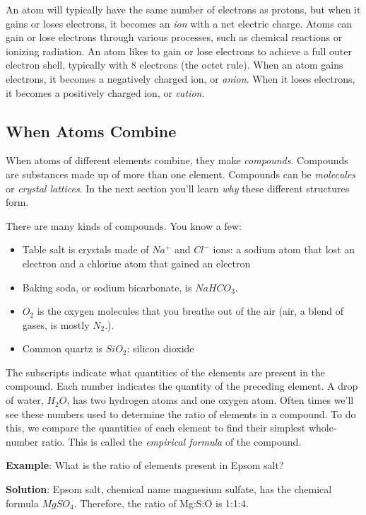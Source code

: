 An atom will typically have the same number of electrons as protons, but when it gains or loses electrons, 
it becomes an \textit{ion} with a net electric charge.  Atoms can gain or lose electrons through various processes, 
such as chemical reactions or ionizing radiation. An atom likes to gain or lose electrons to achieve a full 
outer electron shell, typically with 8 electrons (the octet rule). When an atom gains electrons, it becomes 
a negatively charged ion, or \textit{anion}. When it loses electrons, it becomes a positively charged ion, 
or \textit{cation}. 


\subsection{When Atoms Combine}
When atoms of different elements combine, they make \textit{compounds}. Compounds
are substances made up of more than one element. Compounds can be 
\textit{molecules} or \textit{crystal lattices}. In the next section you'll learn
\textit{why} these different structures form. 

There are many kinds of compounds. You know a few:
\begin{itemize}
\item Table salt is crystals made of $Na^{+}$ and $Cl^{-}$ ions: a sodium atom 
that lost an electron and a chlorine atom that gained an electron
\item Baking soda, or sodium bicarbonate, is $NaHCO_3$.
\item $O_2$ is the oxygen molecules that you breathe out of the air (air, a
blend of gases, is mostly $N_2$.).
\item Common quartz is $SiO_2$: silicon dioxide
\end{itemize}

The subscripts indicate what quantities of the elements are present in the compound. 
Each number indicates the quantity of the preceding element. A drop of water, 
$H_2O$, has two hydrogen atoms and one oxygen atom. Often times we'll see these
numbers used to determine the ratio of elements in a compound. To do this, we 
compare the quantities of each element to find their simplest whole-number ratio. 
This is called the \textit{empirical formula} of the compound.

\textbf{Example}: What is the ratio of elements present in Epsom salt?

\textbf{Solution}: Epsom salt, chemical name magnesium sulfate, has the chemical formula $MgSO_4$. Therefore, the ratio of Mg:S:O is 1:1:4. 

